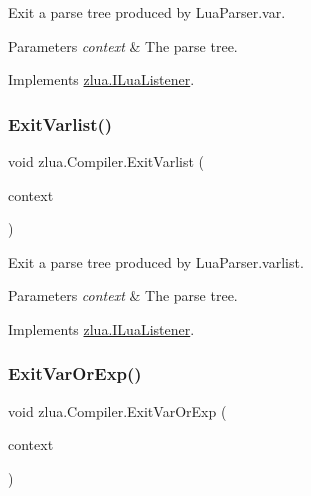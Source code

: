 Exit a parse tree produced by Lua\+Parser.\+var. 


\begin{DoxyParams}{Parameters}
{\em context} & The parse tree.\\
\hline
\end{DoxyParams}


Implements \mbox{\hyperlink{interfacezlua_1_1_i_lua_listener_ab0371ff8288b99ae8fe05ccba2980ee2}{zlua.\+I\+Lua\+Listener}}.

\mbox{\label{classzlua_1_1_compiler_aeec0bb5231adbd6068558564536bc95e}} 
\subsubsection{\texorpdfstring{Exit\+Varlist()}{ExitVarlist()}}
{\footnotesize\ttfamily void zlua.\+Compiler.\+Exit\+Varlist (\begin{DoxyParamCaption}\item[{\mbox{[}\+Not\+Null\mbox{]} \mbox{\hyperlink{classzlua_1_1_lua_parser_1_1_varlist_context}{Lua\+Parser.\+Varlist\+Context}}}]{context }\end{DoxyParamCaption})}



Exit a parse tree produced by Lua\+Parser.\+varlist. 


\begin{DoxyParams}{Parameters}
{\em context} & The parse tree.\\
\hline
\end{DoxyParams}


Implements \mbox{\hyperlink{interfacezlua_1_1_i_lua_listener_a25fcca7c6476226f6faf33597226f9b3}{zlua.\+I\+Lua\+Listener}}.

\mbox{\label{classzlua_1_1_compiler_abdab8a4aa0e213706786e7238295259a}} 
\subsubsection{\texorpdfstring{Exit\+Var\+Or\+Exp()}{ExitVarOrExp()}}
{\footnotesize\ttfamily void zlua.\+Compiler.\+Exit\+Var\+Or\+Exp (\begin{DoxyParamCaption}\item[{\mbox{[}\+Not\+Null\mbox{]} \mbox{\hyperlink{classzlua_1_1_lua_parser_1_1_var_or_exp_context}{Lua\+Parser.\+Var\+Or\+Exp\+Context}}}]{context }\end{DoxyParamCaption})}



